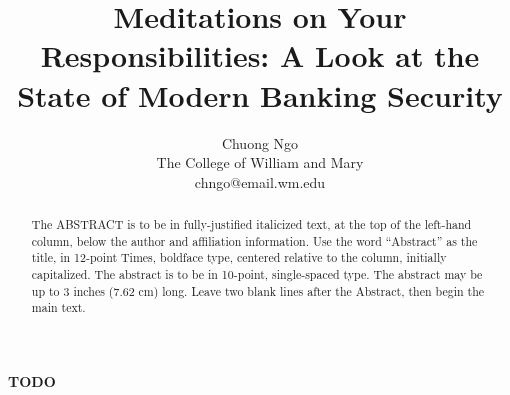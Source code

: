 \documentclass[times, 10pt,twocolumn]{article}
\begin{document}
\title{Meditations on Your Responsibilities: A Look at the State of Modern Banking Security}

\author{Chuong Ngo\\
The College of William and Mary\\
chngo@email.wm.edu
}

\maketitle
\thispagestyle{empty}

\begin{abstract}
   The ABSTRACT is to be in fully-justified italicized text, at the top 
   of the left-hand column, below the author and affiliation 
   information. Use the word ``Abstract'' as the title, in 12-point 
   Times, boldface type, centered relative to the column, initially 
   capitalized. The abstract is to be in 10-point, single-spaced type. 
   The abstract may be up to 3 inches (7.62 cm) long. Leave two blank 
   lines after the Abstract, then begin the main text. 
\end{abstract}


\textbf{TODO} 




\nocite{smyth2010forgotten,
	kleuckerfallback,
	suh2003effect,
	aladwani2001online,
	cheng2006adoption,
	oghenerukeybe2009customers,
	just2009personal
}


\end{document}
